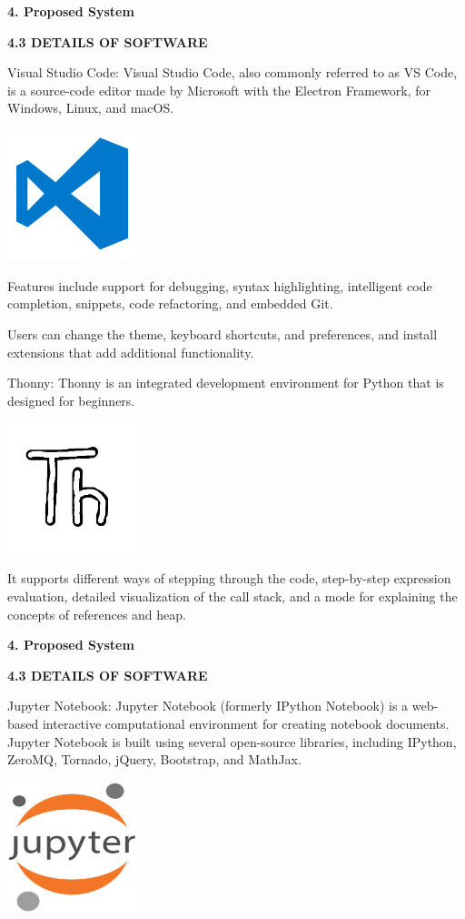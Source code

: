 \documentclass{article}
\begin{document}
\textbf{4. Proposed System}

\textbf{4.3 DETAILS OF SOFTWARE}

{Visual Studio Code}: Visual Studio Code, also commonly referred to as
VS Code, is a source-code editor made by Microsoft with the Electron
Framework, for Windows, Linux, and macOS.

\includegraphics[width=1.49306in,height=1.49306in]{media/9.bmp}

Features include support for debugging, syntax highlighting, intelligent
code completion, snippets, code refactoring, and embedded Git.

Users can change the theme, keyboard shortcuts, and preferences, and
install extensions that add additional functionality.

{Thonny}: Thonny is an integrated development environment for Python
that is designed for beginners.

\includegraphics[width=1.49306in,height=1.49306in]{media/10.bmp}

It supports different ways of stepping through the code, step-by-step
expression evaluation, detailed visualization of the call stack, and a
mode for explaining the concepts of references and heap.

\textbf{4. Proposed System}

\textbf{4.3 DETAILS OF SOFTWARE}

{Jupyter Notebook}: Jupyter Notebook (formerly IPython Notebook) is a
web-based interactive computational environment for creating notebook
documents. Jupyter Notebook is built using several open-source
libraries, including IPython, ZeroMQ, Tornado, jQuery, Bootstrap, and
MathJax.

\includegraphics[width=1.49306in,height=1.49306in]{media/11.jpg}
\end{document}
